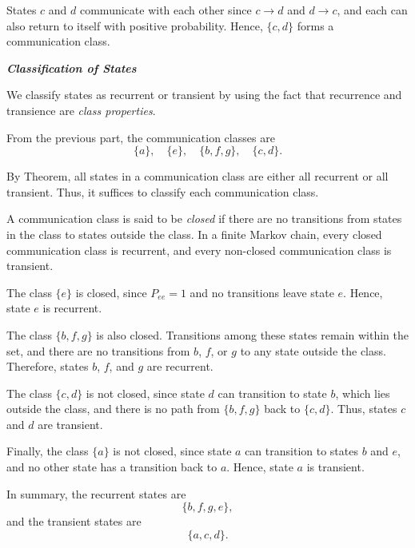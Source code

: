 \documentclass[hidelinks]{article}
\begin{document}
\smallskip

\noindent States $c$ and $d$ communicate with each other since $c \to d$ and $d \to c$, and each can also return to itself with positive probability. Hence,
$\{c,d\}$ forms a communication class.

\medskip

\noindent \textit{\textbf{Classification of States}}

\noindent We classify states as recurrent or transient by using the fact that recurrence
and transience are \emph{class properties}.

\smallskip

\noindent From the previous part, the communication classes are
\[
\{a\}, \quad \{e\}, \quad \{b,f,g\}, \quad \{c,d\}.
\]

\noindent By Theorem, all states in a communication class are either all recurrent or
all transient. Thus, it suffices to classify each communication class.

\smallskip

\noindent A communication class is said to be \emph{closed} if there are no transitions
from states in the class to states outside the class. {\color{red}In a finite Markov chain,
every closed communication class is recurrent, and every non-closed
communication class is transient}.

\smallskip

\noindent The class $\{e\}$ is closed, since $P_{ee}=1$ and no transitions leave state $e$.
Hence, state $e$ is recurrent.

\smallskip

\noindent The class $\{b,f,g\}$ is also closed. Transitions among these states remain
within the set, and there are no transitions from $b$, $f$, or $g$ to any state
outside the class. Therefore, states $b$, $f$, and $g$ are recurrent.

\smallskip

\noindent The class $\{c,d\}$ is not closed, since state $d$ can transition to state $b$,
which lies outside the class, and there is no path from $\{b,f,g\}$ back to
$\{c,d\}$. Thus, states $c$ and $d$ are transient.

\smallskip

\noindent Finally, the class $\{a\}$ is not closed, since state $a$ can transition to
states $b$ and $e$, and no other state has a transition back to $a$. Hence,
state $a$ is transient.

\smallskip

\noindent In summary, the recurrent states are
\[
\{b,f,g,e\},
\]
and the transient states are
\[
\{a,c,d\}.
\]
\end{document}
